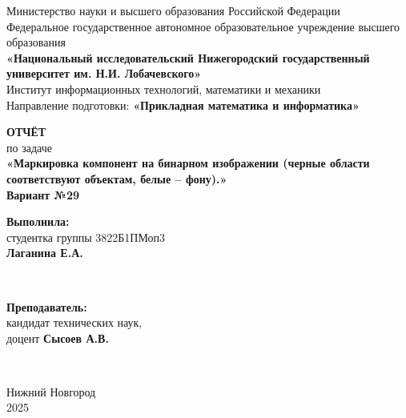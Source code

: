 \documentclass[12pt]{extarticle}
\begin{document}
\begin{titlepage}
    \centering
    \large
    Министерство науки и высшего образования Российской Федерации\\
    Федеральное государственное автономное образовательное учреждение высшего образования\\
    \textbf{«Национальный исследовательский Нижегородский государственный университет им. Н.И. Лобачевского»}\\[0.25cm]
    Институт информационных технологий, математики и механики\\
    Направление подготовки: \textbf{«Прикладная математика и информатика»}\\[1cm]

    \vfill

    {\LARGE \textbf{ОТЧЁТ}}\\
    {\Large по задаче}\\
    {\LARGE \textbf{«Маркировка компонент на бинарном изображении (черные области соответствуют объектам, белые – фону).»}}\\
    {\Large \textbf{Вариант №29}}\\

    \vfill

    \hfill\parbox{0.4\textwidth}{
        \textbf{Выполнила:} \\
        студентка группы 3822Б1ПМоп3 \\
        \textbf{Лаганина Е.А.}
    }\\[0.5cm]

    \hfill\parbox{0.4\textwidth}{
        \textbf{Преподаватель:} \\
        кандидат технических наук,\\
        доцент \textbf{Сысоев А.В.}
    }\\[0.5cm]

    \vfill

    Нижний Новгород\\
    2025
\end{titlepage}


\thispagestyle{empty}
\clearpage
{} 
\setcounter{page}{2} 
\tableofcontents
\clearpage
\setcounter{page}{3} 
\end{document}
